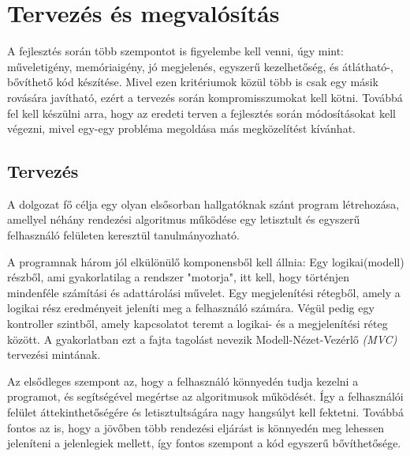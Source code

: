 \documentclass{elteikthesis}
\begin{document}
\section{Tervezés és megvalósítás}
A fejlesztés során több szempontot is figyelembe kell venni, úgy mint: műveletigény, memóriaigény, jó megjelenés, egyszerű kezelhetőség, és átlátható-, bővíthető kód készítése. Mivel ezen kritériumok közül több is csak egy másik rovására javítható, ezért a tervezés során kompromisszumokat kell kötni. Továbbá fel kell készülni arra, hogy az eredeti terven a fejlesztés során módosításokat kell végezni, mivel egy-egy probléma megoldása más megközelítést kívánhat.

\subsection{Tervezés}
A dolgozat fő célja egy olyan elsősorban hallgatóknak szánt program létrehozása, amellyel néhány rendezési algoritmus működése egy letisztult és egyszerű felhasználó felületen keresztül tanulmányozható.\par
A programnak három jól elkülönülő komponensből kell állnia:
Egy logikai(modell) részből, ami gyakorlatilag a rendszer "motorja", itt kell, hogy történjen mindenféle számítási és adattárolási művelet. Egy megjelenítési rétegből, amely a logikai rész eredményeit jeleníti meg a felhasználó számára. Végül pedig egy kontroller szintből, amely kapcsolatot teremt a logikai- és a megjelenítési réteg között. A gyakorlatban ezt a fajta tagolást nevezik Modell-Nézet-Vezérlő \emph{(MVC)} tervezési mintának.\par
Az elsődleges szempont az, hogy a felhasználó könnyedén tudja kezelni a programot, és segítségével megértse az algoritmusok működését. Így a felhasználói felület áttekinthetőségére és letisztultságára nagy hangsúlyt kell fektetni. Továbbá fontos az is, hogy a jövőben több rendezési eljárást is könnyedén meg lehessen jeleníteni a jelenlegiek mellett, így fontos szempont a kód egyszerű bővíthetősége.
\end{document}
